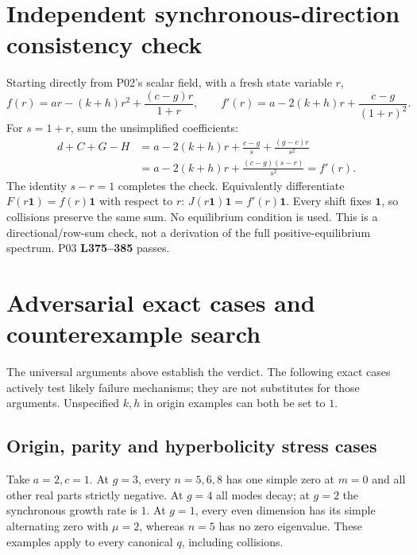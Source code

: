 \documentclass[11pt]{article}
\newcommand{\one}{\mathbf 1}
\newcommand{\lin}[1]{\textbf{L#1}}
\begin{document}
\section{Independent synchronous-direction consistency check}
Starting directly from P02's scalar field, with a fresh state variable $r$,
\[
 f(r)=ar-(k+h)r^2+\frac{(c-g)r}{1+r},\qquad
 f'(r)=a-2(k+h)r+\frac{c-g}{(1+r)^2}.
\]
For $s=1+r$, sum the unsimplified coefficients:
\begin{align*}
 d+C+G-H
 &=a-2(k+h)r+\frac{c-g}{s}+\frac{(g-c)r}{s^2}\\
 &=a-2(k+h)r+\frac{(c-g)(s-r)}{s^2}=f'(r).
\end{align*}
The identity $s-r=1$ completes the check. Equivalently differentiate
$F(r\one)=f(r)\one$ with respect to $r$: $J(r\one)\one=f'(r)\one$.
Every shift fixes $\one$, so collisions preserve the same sum. No equilibrium
condition is used. This is a directional/row-sum check, not a derivation of
the full positive-equilibrium spectrum. P03 \lin{375--385} passes.

\section{Adversarial exact cases and counterexample search}
The universal arguments above establish the verdict. The following exact
cases actively test likely failure mechanisms; they are not substitutes for
those arguments. Unspecified $k,h$ in origin examples can both be set to $1$.

\subsection*{Origin, parity and hyperbolicity stress cases}
Take $a=2,c=1$. At $g=3$, every $n=5,6,8$ has one simple zero at $m=0$
and all other real parts strictly negative. At $g=4$ all modes decay; at
$g=2$ the synchronous growth rate is $1$. At $g=1$, every even dimension
has its simple alternating zero with $\mu=2$, whereas $n=5$ has no zero
eigenvalue. These examples apply to every canonical $q$, including collisions.
\end{document}
